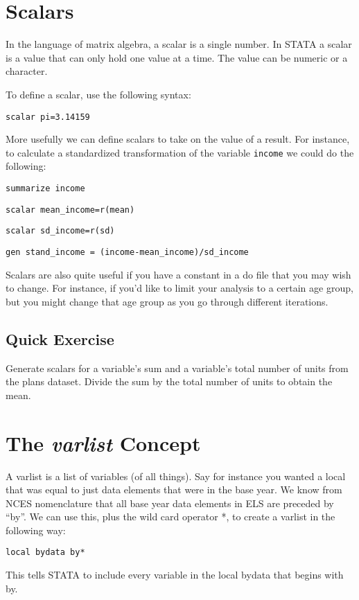 \documentclass[10pt]{article}
\begin{document}
\section{Scalars}

In the language of matrix algebra, a scalar is a single number. In
STATA a scalar is a value that can only hold one value at a time. The
value can be numeric or a character.

To define a scalar, use the following syntax:

\texttt{scalar pi=3.14159}

More usefully we can define scalars to take on the value of a
result. For instance, to calculate a standardized transformation of
the variable \texttt{income} we could do the following:

\texttt{summarize income}

\texttt{scalar mean\_income=r(mean)}

\texttt{scalar sd\_income=r(sd)}

\texttt{gen stand\_income = (income-mean\_income)/sd\_income}

Scalars are also quite useful if you have a constant in a do file that
you may wish to change. For instance, if you'd like to limit your
analysis to a certain age group, but you might change that age group
as you go through different iterations. 

\subsection{Quick Exercise}

Generate scalars for a variable's sum and a variable's total number
of units from the plans dataset. Divide the sum by the total number of
units to obtain the mean. 


\section{The \textit{varlist} Concept}

A varlist is a list of variables (of all things). Say for instance you
wanted a local that was equal to just data elements that were in the
base year. We know from NCES nomenclature that all base year data
elements in ELS are preceded by ``by''. We can use this, plus the wild
card operator *, to create a varlist in the following way: 

\texttt{local bydata by*}

This tells STATA to include every variable in the local bydata that
begins with by. 
\end{document}
